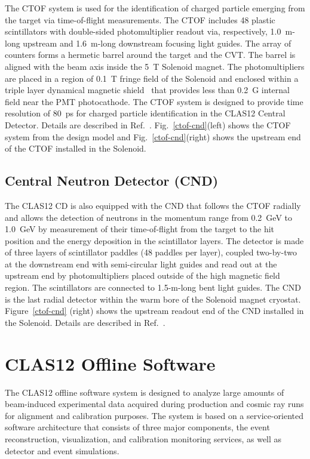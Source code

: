 \documentclass[final,3p,twocolumn]{elsarticle}
\begin{document}
The CTOF system is used for the identification of charged particle emerging from the target via time-of-flight
measurements. The CTOF includes 48 plastic scintillators with double-sided photomultiplier readout via, respectively,
1.0~m-long upstream and 1.6~m-long downstream focusing light guides. The array of counters forms a hermetic barrel
around the target and the CVT. The barrel is aligned with the beam axis inside the 5~T Solenoid magnet. The 
photomultipliers are placed in a region of 0.1~T fringe field of the Solenoid and enclosed within a triple layer dynamical
magnetic shield~\cite{Baturin:2012zz} that provides less than 0.2~G internal field near the PMT photocathode. The
CTOF system is designed to provide time resolution of 80~ps for charged particle identification in the CLAS12 Central
Detector. Details are described in Ref.~\cite{CTOF}. Fig.~\ref{ctof-cnd}(left) shows the CTOF system from the design
model and Fig.~\ref{ctof-cnd}(right) shows the upstream end of the CTOF installed in the Solenoid.

\subsection{Central Neutron Detector (CND)}

The CLAS12 CD is also equipped with the CND that follows the CTOF radially and allows the detection of neutrons in
the momentum range from 0.2~GeV to 1.0~GeV by measurement of their time-of-flight from the target to the hit
position and the energy deposition in the scintillator layers. The detector is made of three layers of scintillator
paddles (48 paddles per layer), coupled two-by-two at the downstream end with semi-circular light guides and read out
at the upstream end by photomultipliers placed outside of the high magnetic field region. The scintillators are connected
to 1.5-m-long bent light guides. The CND is the last radial detector within the warm bore of the Solenoid magnet cryostat. 
Figure~\ref{ctof-cnd} (right) shows the upstream readout end of the CND installed in the Solenoid. Details are described
in Ref.~\cite{CTOF}.

\section{CLAS12 Offline Software}  

The CLAS12 offline software system is designed to analyze large amounts of beam-induced experimental data
acquired during production and cosmic ray runs for alignment and calibration purposes. The system is based on a
service-oriented software architecture that consists of three major components, the event reconstruction,
visualization, and calibration monitoring services, as well as detector and event simulations. 
\end{document}

